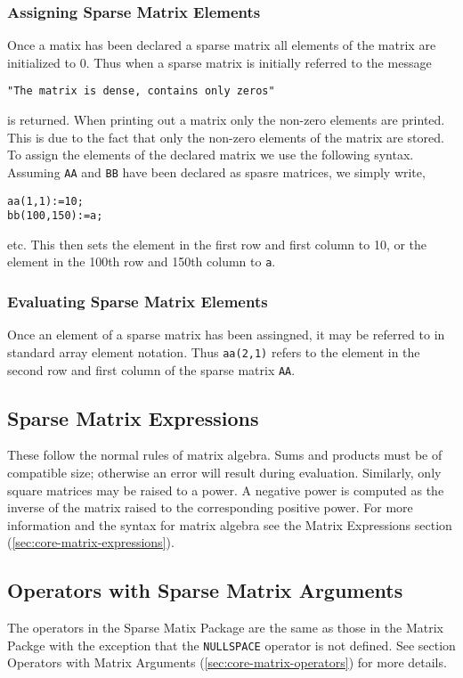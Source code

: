\subsubsection{Assigning Sparse Matrix Elements}
Once a matix has been declared a sparse matrix all elements of the 
matrix are initialized to 0. Thus when a sparse matrix is initially 
referred to the message
\begin{verbatim}
"The matrix is dense, contains only zeros"
\end{verbatim}
is returned. When printing out a matrix only the non-zero elements are 
printed. This is due to the fact that only the non-zero elements of the 
matrix are stored. 
To assign the elements of the declared matrix we use the following 
syntax. Assuming \texttt{AA} and \texttt{BB} have been declared as spasre 
matrices, we simply write,
\begin{verbatim}
aa(1,1):=10;
bb(100,150):=a;
\end{verbatim}
etc. This then sets the element in the first row and first column to 10,
or the element in the 100th row and 150th column to \texttt{a}.

\subsubsection{Evaluating Sparse Matrix Elements}
Once an element of a sparse matrix has been assingned, it may be referred
to in standard array element notation. Thus \texttt{aa(2,1)} refers to the 
element in the second row and first column of the sparse matrix \texttt{AA}.

\subsection{Sparse Matrix Expressions}
These follow the normal rules of matrix algebra. Sums and products must 
be of compatible size; otherwise an error will result during evaluation.
Similarly, only square matrices may be raised to a power.
A negative power is computed as the inverse of the matrix raised to the
corresponding positive power. For more information and the syntax for 
matrix algebra see the Matrix Expressions section (\ref{sec:core-matrix-expressions}).

\subsection{Operators with Sparse Matrix Arguments}
The operators in the Sparse Matix Package are the same as those in the
Matrix Packge with the exception that the \texttt{NULLSPACE} operator is 
not defined. See section Operators with Matrix Arguments 
(\ref{sec:core-matrix-operators}) for more details.

